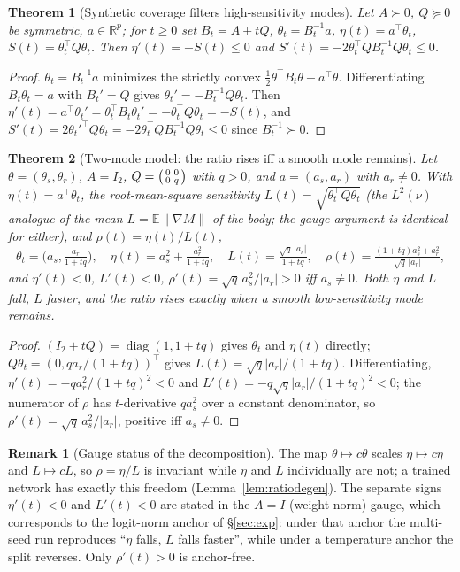\documentclass{article}
\newtheorem{theorem}{Theorem}
\theoremstyle{definition}
\newtheorem{remark}{Remark}
\newcommand{\R}{\mathbb{R}}
\begin{document}
\begin{theorem}[Synthetic coverage filters high-sensitivity modes]\label{thm:vic-filter}
Let $A\succ0$, $Q\succeq0$ be symmetric, $a\in\R^p$; for $t\ge0$ set $B_t=A+tQ$, $\theta_t=B_t^{-1}a$, $\eta(t)=a^\top\theta_t$, $S(t)=\theta_t^\top Q\theta_t$. Then $\eta'(t)=-S(t)\le0$ and $S'(t)=-2\theta_t^\top QB_t^{-1}Q\theta_t\le0$.
\end{theorem}
\begin{proof}
$\theta_t=B_t^{-1}a$ minimizes the strictly convex $\tfrac12\theta^\top B_t\theta-a^\top\theta$. Differentiating $B_t\theta_t=a$ with $B_t'=Q$ gives $\theta_t'=-B_t^{-1}Q\theta_t$. Then $\eta'(t)=a^\top\theta_t'=\theta_t^\top B_t\theta_t'=-\theta_t^\top Q\theta_t=-S(t)$, and $S'(t)=2\theta_t'^\top Q\theta_t=-2\theta_t^\top QB_t^{-1}Q\theta_t\le0$ since $B_t^{-1}\succ0$.
\end{proof}

\begin{theorem}[Two-mode model: the ratio rises iff a smooth mode remains]\label{thm:vic-twomode}
Let $\theta=(\theta_s,\theta_r)$, $A=I_2$, $Q=\begin{psmallmatrix}0&0\\0&q\end{psmallmatrix}$ with $q>0$, and $a=(a_s,a_r)$ with $a_r\neq0$. With $\eta(t)=a^\top\theta_t$, the root-mean-square sensitivity $L(t)=\sqrt{\theta_t^\top Q\theta_t}$ (the $L^2(\nu)$ analogue of the mean $L=\mathbb E\|\nabla M\|$ of the body; the gauge argument is identical for either), and $\rho(t)=\eta(t)/L(t)$,
\[ \theta_t=\Big(a_s,\tfrac{a_r}{1+tq}\Big),\quad \eta(t)=a_s^2+\tfrac{a_r^2}{1+tq},\quad L(t)=\tfrac{\sqrt q\,|a_r|}{1+tq},\quad \rho(t)=\tfrac{(1+tq)a_s^2+a_r^2}{\sqrt q\,|a_r|}, \]
and $\eta'(t)<0$, $L'(t)<0$, $\rho'(t)=\sqrt q\,a_s^2/|a_r|>0$ iff $a_s\neq0$. Both $\eta$ and $L$ fall, $L$ faster, and the ratio rises exactly when a smooth low-sensitivity mode remains.
\end{theorem}
\begin{proof}
$(I_2+tQ)=\operatorname{diag}(1,1+tq)$ gives $\theta_t$ and $\eta(t)$ directly; $Q\theta_t=(0,qa_r/(1+tq))^\top$ gives $L(t)=\sqrt q|a_r|/(1+tq)$. Differentiating, $\eta'(t)=-qa_r^2/(1+tq)^2<0$ and $L'(t)=-q\sqrt q|a_r|/(1+tq)^2<0$; the numerator of $\rho$ has $t$-derivative $qa_s^2$ over a constant denominator, so $\rho'(t)=\sqrt q\,a_s^2/|a_r|$, positive iff $a_s\neq0$.
\end{proof}

\begin{remark}[Gauge status of the decomposition]\label{rem:vic-gauge}
The map $\theta\mapsto c\theta$ scales $\eta\mapsto c\eta$ and $L\mapsto cL$, so $\rho=\eta/L$ is invariant while $\eta$ and $L$ individually are not; a trained network has exactly this freedom (Lemma~\ref{lem:ratiodegen}). The separate signs $\eta'(t)<0$ and $L'(t)<0$ are stated in the $A=I$ (weight-norm) gauge, which corresponds to the logit-norm anchor of \S\ref{sec:exp}: under that anchor the multi-seed run reproduces ``$\eta$ falls, $L$ falls faster'', while under a temperature anchor the split reverses. Only $\rho'(t)>0$ is anchor-free.
\end{remark}
\end{document}
